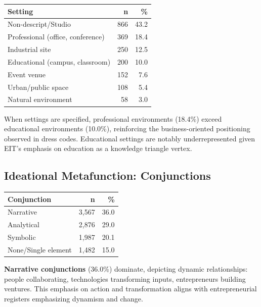 \documentclass[../main.tex]{subfiles}
\begin{document}
\begin{center}
\small
\begin{tabular}{lrr}
\toprule
\textbf{Setting} & \textbf{n} & \textbf{\%} \\
\midrule
Non-descript/Studio & 866 & 43.2 \\
Professional (office, conference) & 369 & 18.4 \\
Industrial site & 250 & 12.5 \\
Educational (campus, classroom) & 200 & 10.0 \\
Event venue & 152 & 7.6 \\
Urban/public space & 108 & 5.4 \\
Natural environment & 58 & 3.0 \\
\bottomrule
\end{tabular}
\end{center}

When settings are specified, professional environments (18.4\%) exceed educational environments (10.0\%), reinforcing the business-oriented positioning observed in dress codes. Educational settings are notably underrepresented given EIT's emphasis on education as a knowledge triangle vertex.

\subsection{Ideational Metafunction: Conjunctions}

\begin{margintable}
\centering
\small
\begin{tabular}{lrr}
\toprule
\textbf{Conjunction} & \textbf{n} & \textbf{\%} \\
\midrule
Narrative & 3,567 & 36.0 \\
Analytical & 2,876 & 29.0 \\
Symbolic & 1,987 & 20.1 \\
None/Single element & 1,482 & 15.0 \\
\bottomrule
\end{tabular}
\caption{Conjunction types}
\end{margintable}

\textbf{Narrative conjunctions} (36.0\%) dominate, depicting dynamic relationships: people collaborating, technologies transforming inputs, entrepreneurs building ventures. This emphasis on action and transformation aligns with entrepreneurial registers emphasizing dynamism and change.
\end{document}
